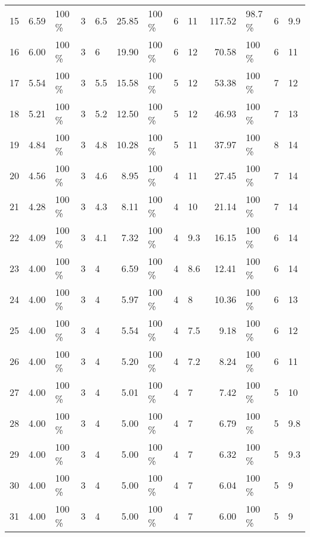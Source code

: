 \documentclass{article}
\begin{document}
\begin{tabular}{c|rlll|rlll|rlll}
15 &  6.59 	&100  \% &     3 &   6.5 & 25.85 	&100  \% &     6 &    11 &117.52 	&98.7 \% &     6 &   9.9\\
16 &  6.00 	&100  \% &     3 &     6 & 19.90 	&100  \% &     6 &    12 & 70.58 	&100  \% &     6 &    11\\
17 &  5.54 	&100  \% &     3 &   5.5 & 15.58 	&100  \% &     5 &    12 & 53.38 	&100  \% &     7 &    12\\
18 &  5.21 	&100  \% &     3 &   5.2 & 12.50 	&100  \% &     5 &    12 & 46.93 	&100  \% &     7 &    13\\
19 &  4.84 	&100  \% &     3 &   4.8 & 10.28 	&100  \% &     5 &    11 & 37.97 	&100  \% &     8 &    14\\
20 &  4.56 	&100  \% &     3 &   4.6 &  8.95 	&100  \% &     4 &    11 & 27.45 	&100  \% &     7 &    14\\
21 &  4.28 	&100  \% &     3 &   4.3 &  8.11 	&100  \% &     4 &    10 & 21.14 	&100  \% &     7 &    14\\
22 &  4.09 	&100  \% &     3 &   4.1 &  7.32 	&100  \% &     4 &   9.3 & 16.15 	&100  \% &     6 &    14\\
23 &  4.00 	&100  \% &     3 &     4 &  6.59 	&100  \% &     4 &   8.6 & 12.41 	&100  \% &     6 &    14\\
24 &  4.00 	&100  \% &     3 &     4 &  5.97 	&100  \% &     4 &     8 & 10.36 	&100  \% &     6 &    13\\
25 &  4.00 	&100  \% &     3 &     4 &  5.54 	&100  \% &     4 &   7.5 &  9.18 	&100  \% &     6 &    12\\
26 &  4.00 	&100  \% &     3 &     4 &  5.20 	&100  \% &     4 &   7.2 &  8.24 	&100  \% &     6 &    11\\
27 &  4.00 	&100  \% &     3 &     4 &  5.01 	&100  \% &     4 &     7 &  7.42 	&100  \% &     5 &    10\\
28 &  4.00 	&100  \% &     3 &     4 &  5.00 	&100  \% &     4 &     7 &  6.79 	&100  \% &     5 &   9.8\\
29 &  4.00 	&100  \% &     3 &     4 &  5.00 	&100  \% &     4 &     7 &  6.32 	&100  \% &     5 &   9.3\\
30 &  4.00 	&100  \% &     3 &     4 &  5.00 	&100  \% &     4 &     7 &  6.04 	&100  \% &     5 &     9\\
31 &  4.00 	&100  \% &     3 &     4 &  5.00 	&100  \% &     4 &     7 &  6.00 	&100  \% &     5 &     9\\
        \end{tabular}\\
\end{document}
